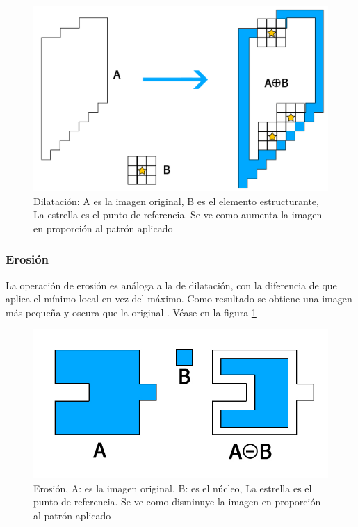 \begin{figure}[hbtp]

\centering
\includegraphics[scale=0.2]{imagenes/erosion-model.jpg}
\caption{Dilatación: A es la imagen original, B es el elemento estructurante, La estrella es el punto de referencia. Se ve como aumenta la imagen en proporci\'on al patr\'on aplicado }
\end{figure}

\subsubsection{Erosión}

La operación de erosión es análoga a la de dilatación, con la diferencia de que aplica el mínimo local en vez del máximo. Como resultado se obtiene una imagen más pequeña y oscura que la original \cite{BookOpenCv}. V\'ease en la figura \ref{fig:erosion}

\begin{figure}[hbtp]
\centering
\includegraphics[scale=0.3]{imagenes/erosion.jpg}
\caption{Erosión,  A: es la imagen original, B: es el n\'ucleo, La estrella es el punto de referencia. Se ve como disminuye la imagen en proporci\'on al patr\'on aplicado}
\label{fig:erosion}
\end{figure}

